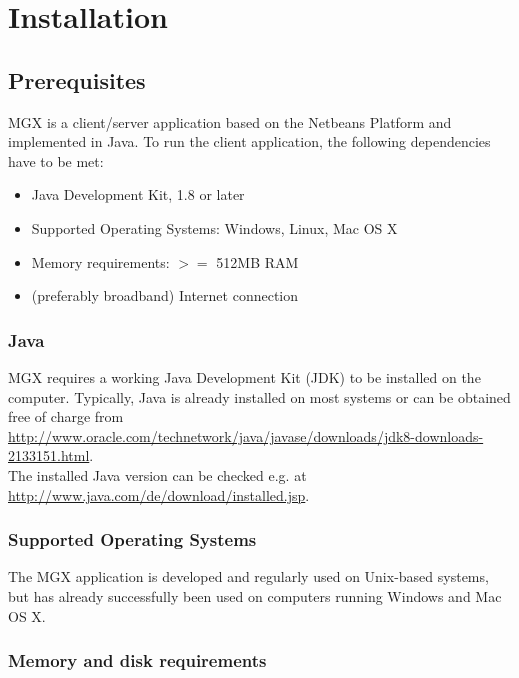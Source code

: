 
\chapter{Installation}
\label{installation}

\section{Prerequisites}

MGX is a client/server application based on the Netbeans Platform and implemented
in Java. To run the client application, the following dependencies have to be
met:

\begin{itemize}
  \item{Java Development Kit, 1.8 or later}
  \item{Supported Operating Systems: Windows, Linux, Mac OS X}
  \item{Memory requirements: $>=$ 512MB RAM}
  \item{(preferably broadband) Internet connection}
\end{itemize}

\subsection{Java}

MGX requires a working Java Development Kit (JDK) to be installed on the computer. Typically,
Java is already installed on most systems or can be obtained free of charge from\\

\url{http://www.oracle.com/technetwork/java/javase/downloads/jdk8-downloads-2133151.html}.\\

The installed Java version can be checked e.g. at\\

\url{http://www.java.com/de/download/installed.jsp}.

\subsection{Supported Operating Systems}

The MGX application is developed and regularly used on Unix-based systems,
but has already successfully been used on computers running Windows and
Mac OS X.

\subsection{Memory and disk requirements}


